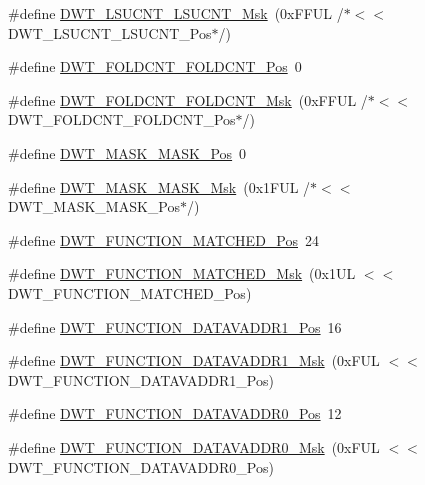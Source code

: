 \begin{DoxyCompactItemize}
\item 
\#define \hyperlink{group__CMSIS__DWT_ga2186d7fc9317e20bad61336ee2925615}{D\+W\+T\+\_\+\+L\+S\+U\+C\+N\+T\+\_\+\+L\+S\+U\+C\+N\+T\+\_\+\+Msk}~(0x\+F\+F\+U\+L /$\ast$$<$$<$ D\+W\+T\+\_\+\+L\+S\+U\+C\+N\+T\+\_\+\+L\+S\+U\+C\+N\+T\+\_\+\+Pos$\ast$/)
\item 
\#define \hyperlink{group__CMSIS__DWT_ga7f8af5ac12d178ba31a516f6ed141455}{D\+W\+T\+\_\+\+F\+O\+L\+D\+C\+N\+T\+\_\+\+F\+O\+L\+D\+C\+N\+T\+\_\+\+Pos}~0
\item 
\#define \hyperlink{group__CMSIS__DWT_ga9cb73d0342d38b14e41027d3c5c02647}{D\+W\+T\+\_\+\+F\+O\+L\+D\+C\+N\+T\+\_\+\+F\+O\+L\+D\+C\+N\+T\+\_\+\+Msk}~(0x\+F\+F\+U\+L /$\ast$$<$$<$ D\+W\+T\+\_\+\+F\+O\+L\+D\+C\+N\+T\+\_\+\+F\+O\+L\+D\+C\+N\+T\+\_\+\+Pos$\ast$/)
\item 
\#define \hyperlink{group__CMSIS__DWT_gaf798ae34e2b9280ea64f4d9920cd2e7d}{D\+W\+T\+\_\+\+M\+A\+S\+K\+\_\+\+M\+A\+S\+K\+\_\+\+Pos}~0
\item 
\#define \hyperlink{group__CMSIS__DWT_gadd798deb0f1312feab4fb05dcddc229b}{D\+W\+T\+\_\+\+M\+A\+S\+K\+\_\+\+M\+A\+S\+K\+\_\+\+Msk}~(0x1\+F\+U\+L /$\ast$$<$$<$ D\+W\+T\+\_\+\+M\+A\+S\+K\+\_\+\+M\+A\+S\+K\+\_\+\+Pos$\ast$/)
\item 
\#define \hyperlink{group__CMSIS__DWT_ga22c5787493f74a6bacf6ffb103a190ba}{D\+W\+T\+\_\+\+F\+U\+N\+C\+T\+I\+O\+N\+\_\+\+M\+A\+T\+C\+H\+E\+D\+\_\+\+Pos}~24
\item 
\#define \hyperlink{group__CMSIS__DWT_gac8b1a655947490280709037808eec8ac}{D\+W\+T\+\_\+\+F\+U\+N\+C\+T\+I\+O\+N\+\_\+\+M\+A\+T\+C\+H\+E\+D\+\_\+\+Msk}~(0x1\+U\+L $<$$<$ D\+W\+T\+\_\+\+F\+U\+N\+C\+T\+I\+O\+N\+\_\+\+M\+A\+T\+C\+H\+E\+D\+\_\+\+Pos)
\item 
\#define \hyperlink{group__CMSIS__DWT_ga8b75e8ab3ffd5ea2fa762d028dc30e8c}{D\+W\+T\+\_\+\+F\+U\+N\+C\+T\+I\+O\+N\+\_\+\+D\+A\+T\+A\+V\+A\+D\+D\+R1\+\_\+\+Pos}~16
\item 
\#define \hyperlink{group__CMSIS__DWT_gafdbf5a8c367befe8661a4f6945c83445}{D\+W\+T\+\_\+\+F\+U\+N\+C\+T\+I\+O\+N\+\_\+\+D\+A\+T\+A\+V\+A\+D\+D\+R1\+\_\+\+Msk}~(0x\+F\+U\+L $<$$<$ D\+W\+T\+\_\+\+F\+U\+N\+C\+T\+I\+O\+N\+\_\+\+D\+A\+T\+A\+V\+A\+D\+D\+R1\+\_\+\+Pos)
\item 
\#define \hyperlink{group__CMSIS__DWT_ga9854cd8bf16f7dce0fb196a8029b018e}{D\+W\+T\+\_\+\+F\+U\+N\+C\+T\+I\+O\+N\+\_\+\+D\+A\+T\+A\+V\+A\+D\+D\+R0\+\_\+\+Pos}~12
\item 
\#define \hyperlink{group__CMSIS__DWT_gafc5efbe8f9b51e04aecd00c8a4eb50fb}{D\+W\+T\+\_\+\+F\+U\+N\+C\+T\+I\+O\+N\+\_\+\+D\+A\+T\+A\+V\+A\+D\+D\+R0\+\_\+\+Msk}~(0x\+F\+U\+L $<$$<$ D\+W\+T\+\_\+\+F\+U\+N\+C\+T\+I\+O\+N\+\_\+\+D\+A\+T\+A\+V\+A\+D\+D\+R0\+\_\+\+Pos)
$$
\end{DoxyCompactItemize}
